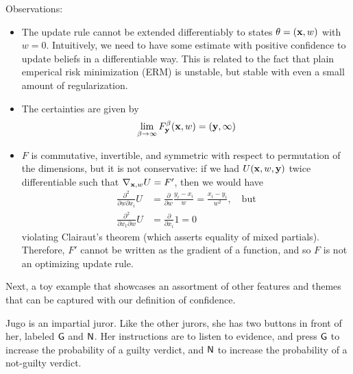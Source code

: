 \begin{subappendices}
\begin{example}
    	Observations:
    	\begin{itemize}
    		\item The update rule cannot be extended differentiably to states $\theta = (\mathbf x, w)$ with $w = 0$.
    			Intuitively, we need to have some estimate with positive confidence to update beliefs in a differentiable way.
            This is related to the fact that plain emperical risk minimization (ERM) is unstable, but stable with even a small amount of regularization.
    		\item The certainties are given by
    		\[
    			\lim_{\beta \to \infty} F^{\beta}_{\mathbf y}(\mathbf x, w) = (\mathbf y, \infty)
    		\]
    		\item $F$ is commutative, invertible, and symmetric with respect to permutation of the dimensions, but it is not conservative: if we had $U(\mathbf x, w, \mathbf y)$ twice differentiable such that $\nabla_{\mathbf x, w} U = F'$, then we would have
            \begin{align*}
            \frac{\partial^2}{\partial w \partial x_i} U &=
    			\frac\partial{\partial w} \frac{y_i - x_i}{w} = \frac{x_i - y_i}{w^2},\quad\text{but}
                \\
    		\frac{\partial^2}{\partial x_1 \partial w} U
    			&= \frac\partial{\partial x_i} 1 = 0    
            \end{align*}
    		violating Clairaut's theorem (which asserts equality of mixed partials).
    		Therefore, $F'$ cannot be written as the gradient of a function,
            and so $F$ is not an optimizing update rule. \qedhere
    	\end{itemize}
    \end{example}

    Next, a toy example that showcases an assortment of other features and themes that can be captured with our definition of confidence.

    \begin{example}\label{ex:jugo}
    \def\pressed(#1,#2,#3){\mathit{pressed}(#1,\mathsf{#2},#3)}
    Jugo is an impartial juror.
    Like the other jurors, she has two buttons in front of her,
    labeled $\sf G$ and $\sf N$.
    Her instructions are to listen to evidence, and press $\sf G$ to 
    increase the probability of a guilty verdict, and $\sf N$ 
    to increase the probability of a not-guilty verdict.


\end{example}
\end{subappendices}
